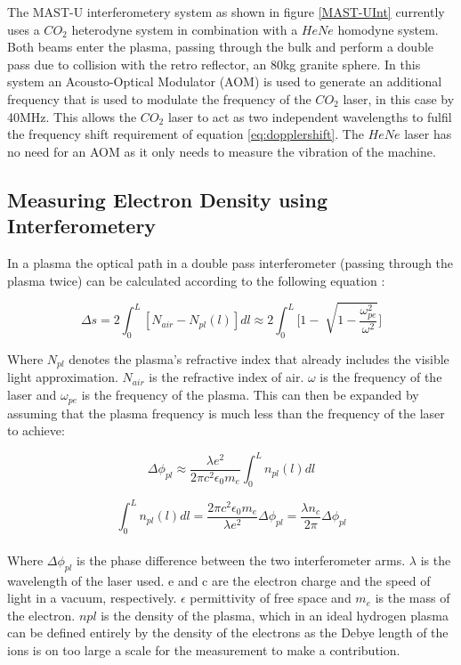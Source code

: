 \documentclass[12pt,a4paper,oneside]{report}
\begin{document}
The MAST-U interferometery system as shown in figure \autoref{MAST-UInt} currently uses a $CO_{2}$ heterodyne system in combination with a $HeNe$ homodyne system. Both beams enter the plasma, passing through the bulk and perform a double pass due to collision with the retro reflector, an 80kg granite sphere. In this system an Acousto-Optical Modulator (AOM) is used to generate an additional frequency that is used to modulate the frequency of the $CO_{2}$ laser, in this case by 40MHz. This allows the $CO_{2}$ laser to act as two independent wavelengths to fulfil the frequency shift requirement of equation \ref{eq:dopplershift}. The $HeNe$ laser has no need for an AOM as it only needs to measure the vibration of the machine.

    \subsection{Measuring Electron Density using Interferometery}
In a plasma the optical path in a double pass interferometer (passing through the plasma twice) can be calculated according to the following equation \cite[p.~26]{Brunner2017} :

\begin{equation}
	\Delta s = 2 \int_{0}^{L} [N_{air} - N_{pl}(l)]dl \approx 2 \int_{0}^{L} \Bigg[1 - \sqrt[]{1-\frac{\omega_{pe}^{2}}{\omega^{2}}}\Bigg]
	\label{eq:opticalpathint}
\end{equation}

Where $N_{pl}$ denotes the plasma's refractive index that already includes the visible light approximation. $N_{air}$ is the refractive index of air. $\omega$ is the frequency of the laser and $\omega_{pe}$ is the frequency of the plasma. This can then be expanded by assuming that the plasma frequency is much less than the frequency of the laser to achieve:

\begin{equation}
	\Delta\phi_{pl} \approx \frac{\lambda e^{2}}{2 \pi c^{2} \epsilon_{0} m_{e}} \int_{0}^{L} n_{pl} (l) dl
	\label{eq:plasmaphase}
\end{equation}

\begin{equation}
	\int_{0}^{L} n_{pl} (l) dl = \frac{2 \pi c^{2} \epsilon_{0} m_{e}}{\lambda e^{2}} \Delta\phi_{pl} = \frac{\lambda n_{c}}{2 \pi} \Delta\phi_{pl}
	\label{eq:phaseintegral}
\end{equation}
\\
Where $\Delta\phi_{pl}$ is the phase difference between the two interferometer arms. $\lambda$ is the wavelength of the laser used. e and c are the electron charge and the speed of light in a vacuum, respectively. $\epsilon$ permittivity of free space and $m_{e}$ is the mass of the electron. $n{pl}$ is the density of the plasma, which in an ideal hydrogen plasma can be defined entirely by the density of the electrons as the Debye length of the ions is on too large a scale for the measurement to make a contribution. 
\end{document}
